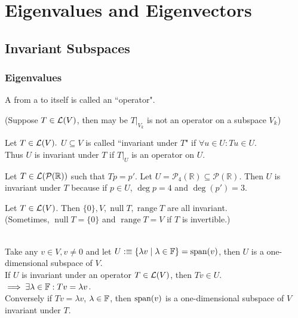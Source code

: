 \chapter{Eigenvalues and Eigenvectors}
\section{Invariant Subspaces}
\subsection{Eigenvalues}

\begin{mydef}
    A \lm from a \vs to itself is called an ``operator". 
\end{mydef}

(Suppose $T\in \mathcal{L}(V)$, then may be $\left.T\right|_{V_{k}}$ is not an operator on a subspace $V_k$)

\begin{mydef}
    Let $T\in \mathcal{L}(V).$ $U \subseteq V$ is called ``invariant under $T$" if $\forall u \in U: Tu \in U.$ \\
    Thus $U$ is invariant under $T$ if $\left.T\right|_{U}$ is an operator on $U.$
\end{mydef}

\begin{example}
    Let $T\in \mathcal{L}(\mathcal{P}(\mathbb{R}))$ such that $Tp=p'.$ Let $U=\mathcal{P}_4(\mathbb{R}) \subseteq \mathcal{P}(\mathbb{R}).$ Then $U$ is invariant under $T$
    because if $p \in U$, $\deg p = 4$ and $\deg (p')=3$.
\end{example}

\begin{example}
    Let $T\in \mathcal{L}(V)$. Then $\{0\}, V, \operatorname{null} T, \operatorname{range} T$ are all invariant. \\
    (Sometimes, $\operatorname{null} T = \{0\}$ and $\operatorname{range} T=V$ if $T$ is invertible.)
\end{example}

 \\
Take any $v\in V, v\neq 0$ and let $U :\equiv \{  \lambda v \mid \lambda \in \mathbb{F} \} = \operatorname{span} (v)$, then $U$ is a one-dimensional subspace of $V$. \\
If $U$ is invariant under an operator $T \in \mathcal{L} (V)$, then $Tv  \in U$. $\implies \exists \lambda \in \mathbb{F}: Tv = \lambda v$. \\
Conversely if $Tv = \lambda v$, $\lambda \in \mathbb{F}$, then $\operatorname{span} (v)$ is a one-dimensional subspace of $V$ invariant under $T$. 

